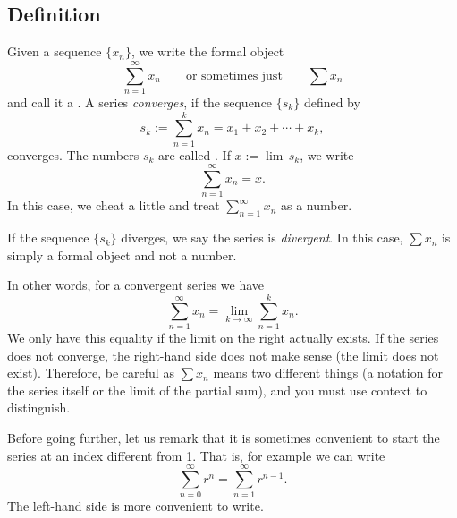 \subsection{Definition}

\begin{defn}
Given a sequence $\{ x_n \}$, we write the formal object
\begin{equation*}
\sum_{n=1}^\infty x_n
\qquad
\text{or sometimes just}
\qquad
\sum x_n
\end{equation*}
and call it a \emph{}.  A series
\emph{converges}, if the sequence $\{ s_k \}$
defined by
\begin{equation*}
s_k := \sum_{n=1}^k x_n = x_1 + x_2 + \cdots + x_k ,
\end{equation*}
converges.
The numbers $s_k$ are called
\emph{}.
If $x := \lim\, s_k$, we write
\begin{equation*}
\sum_{n=1}^\infty x_n =  x .
\end{equation*}
In this case, we cheat a little and treat
$\sum_{n=1}^\infty x_n$ as a number.

If the sequence $\{ s_k \}$ diverges,
we say the series is \emph{divergent}.
In this case, $\sum x_n$ is simply a formal object and not a number.
\end{defn}

In other words, for a convergent series we have
\begin{equation*}
\sum_{n=1}^\infty x_n
=
\lim_{k\to\infty} 
\sum_{n=1}^k x_n .
\end{equation*}
We only have this equality if the limit on
the right actually exists.  If the series does not converge, the right-hand
side does not make sense (the limit does not exist).
Therefore, be careful as 
$\sum x_n$ means two different things (a notation for the series itself 
or the limit of the partial sum), and you must use context
to distinguish.

\begin{remark}
Before going further, let us remark that it is sometimes convenient to start
the series at an index different from 1.  That is, for example we can write
\begin{equation*}
\sum_{n=0}^\infty r^n = \sum_{n=1}^\infty r^{n-1} .
\end{equation*}
The left-hand side is more convenient to write.
\end{remark}

